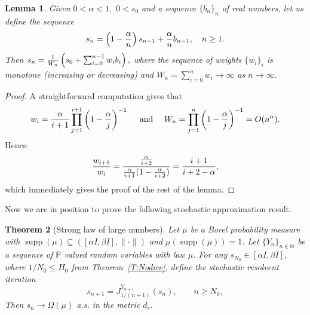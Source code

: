 \documentclass[12pt,reqno]{amsart}
\newtheorem{theorem}{Theorem}[section]
\newtheorem{lemma}[theorem]{Lemma}
\DeclareMathOperator{\supp}{\mathrm{supp}}
\begin{document}
  \begin{lemma}\label{L:Etemadi}
      Given $0 < \alpha < 1,$ $0 < s_0$ and a sequence $\{b_n\}_n$ of real numbers, let us define the sequence
      $$ s_{n} = \left(1 - {\alpha \over n}\right)s_{n-1} + {\alpha \over n} b_{n-1}, \quad n \geq 1.$$
      Then $s_n = {1 \over W_n} \left(s_0 + \sum_{i=0}^{n-1} w_ib_i \right),$ where the sequence of weights $\{w_i\}_i$ is monotone (increasing or decreasing) and $W_n = \sum_{i=0}^n w_i \rightarrow \infty$ as $n \rightarrow \infty.$
  \end{lemma}

 \begin{proof}
        A straightforward computation gives that
       $$ w_i = {\alpha \over i+1} \prod_{j=1}^{i+1} \left(1 - {\alpha \over j}\right)^{-1} \quad \mbox{ and } \quad W_n = \prod_{j=1}^n \left(1 - {\alpha \over j}\right)^{-1} = O(n^\alpha).$$
       Hence
       $$ {w_{i+1} \over w_i} = { {\alpha \over i+2} \over {\alpha \over i+1}(1- {\alpha \over i+2})} = {
       i+1 \over i+2 - \alpha},$$ which immediately gives the proof of the rest of the lemma.
 \end{proof}

Now we are in position to prove the following stochastic approximation result.

\begin{theorem}[Strong law of large numbers]\label{T:slln}
Let $\mu$ be a Borel probability measure with $\supp(\mu)\subseteq([\alpha I,\beta I],\|\cdot\|)$ and $\mu(\supp(\mu))=1$. Let $\{Y_n\}_{n\in\mathbb{N}}$ be a sequence of $\mathbb{P}$ valued random variables with law $\mu$. For any \(s_{N_0}\in [\alpha I,\beta I]\), where $1/N_0 \leq H_0$ from Theorem~\ref{T:Nodice}, define the stochastic resolvent iteration
\begin{equation}\label{eq:cyclic-iteration-BW2}
s_{n+1}=J_{1/(n+1)}^{Y_{n+1}}(s_n),
\qquad
n\ge N_0,
\end{equation}
Then
$s_n\longrightarrow \Omega (\mu)$ a.s. in the metric $d_\epsilon$.
\end{theorem}
\end{document}
